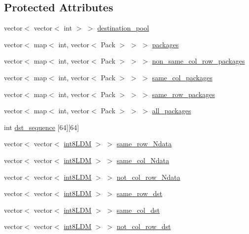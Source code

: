 \subsection*{Protected Attributes}
\begin{DoxyCompactItemize}
\item 
vector$<$ vector$<$ int $>$ $>$ \mbox{\hyperlink{classRlmpiInitializer_abbfabd8d99d7ea5daa9a6b8dd6c46e14}{destination\+\_\+pool}}
\item 
vector$<$ map$<$ int, vector$<$ Pack $>$ $>$ $>$ \mbox{\hyperlink{classRlmpiInitializer_a793a9b5f2f582c4442bc44ea1e23ed18}{packages}}
\item 
vector$<$ map$<$ int, vector$<$ Pack $>$ $>$ $>$ \mbox{\hyperlink{classRlmpiInitializer_a0699d7f35bc71fe2901a9ee909d24bd6}{non\+\_\+same\+\_\+col\+\_\+row\+\_\+packages}}
\item 
vector$<$ map$<$ int, vector$<$ Pack $>$ $>$ $>$ \mbox{\hyperlink{classRlmpiInitializer_ad354dc08b1e1e16f29e9807162870fc7}{same\+\_\+col\+\_\+packages}}
\item 
vector$<$ map$<$ int, vector$<$ Pack $>$ $>$ $>$ \mbox{\hyperlink{classRlmpiInitializer_aebed5253aca74dbc96d05387067ddeac}{same\+\_\+row\+\_\+packages}}
\item 
vector$<$ map$<$ int, vector$<$ Pack $>$ $>$ $>$ \mbox{\hyperlink{classRlmpiInitializer_ab334fdca31be507e1a619c273827d318}{all\+\_\+packages}}
\item 
int \mbox{\hyperlink{classRlmpiInitializer_abe02b9c31b4282bdfc9773849c24fa6f}{dst\+\_\+sequence}} \mbox{[}64\mbox{]}\mbox{[}64\mbox{]}
\item 
vector$<$ vector$<$ \mbox{\hyperlink{include_2RlmpiShared_8h_a69782ffde89d45e86308f10afedf08a6}{int8\+L\+DM}} $>$ $>$ \mbox{\hyperlink{classRlmpiInitializer_a23f3a5eb65887094025ebfaad85dd36a}{same\+\_\+row\+\_\+\+Ndata}}
\item 
vector$<$ vector$<$ \mbox{\hyperlink{include_2RlmpiShared_8h_a69782ffde89d45e86308f10afedf08a6}{int8\+L\+DM}} $>$ $>$ \mbox{\hyperlink{classRlmpiInitializer_af373e8c1556b8c90d48eab0a44aec4d8}{same\+\_\+col\+\_\+\+Ndata}}
\item 
vector$<$ vector$<$ \mbox{\hyperlink{include_2RlmpiShared_8h_a69782ffde89d45e86308f10afedf08a6}{int8\+L\+DM}} $>$ $>$ \mbox{\hyperlink{classRlmpiInitializer_ab3b8cf4ea6b320b091146b42d59ee60d}{not\+\_\+col\+\_\+row\+\_\+\+Ndata}}
\item 
vector$<$ vector$<$ \mbox{\hyperlink{include_2RlmpiShared_8h_a69782ffde89d45e86308f10afedf08a6}{int8\+L\+DM}} $>$ $>$ \mbox{\hyperlink{classRlmpiInitializer_a8f7e3950dee221b89915b070395f383d}{same\+\_\+row\+\_\+dst}}
\item 
vector$<$ vector$<$ \mbox{\hyperlink{include_2RlmpiShared_8h_a69782ffde89d45e86308f10afedf08a6}{int8\+L\+DM}} $>$ $>$ \mbox{\hyperlink{classRlmpiInitializer_a5f4053c7ae5aa835d23c17e01dbffde9}{same\+\_\+col\+\_\+dst}}
\item 
vector$<$ vector$<$ \mbox{\hyperlink{include_2RlmpiShared_8h_a69782ffde89d45e86308f10afedf08a6}{int8\+L\+DM}} $>$ $>$ \mbox{\hyperlink{classRlmpiInitializer_afb1edb3cd0884d3057dc3b6e89a9c6cb}{not\+\_\+col\+\_\+row\+\_\+dst}}
\end{DoxyCompactItemize}
